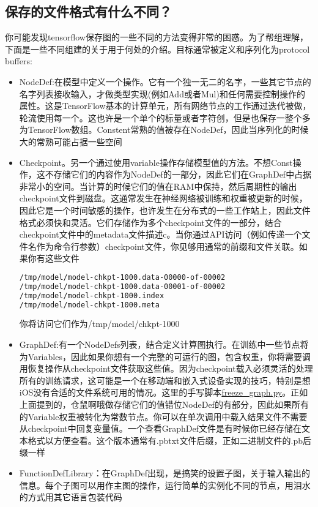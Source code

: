 \subsection{保存的文件格式有什么不同？}
你可能发现tensorflow保存图的一些不同的方法变得非常的困惑。为了帮组理解，下面是一些不同组建的关于用于何处的介绍。目标通常被定义和序列化为protocol buffers:
\begin{itemize}
\item NodeDef:在模型中定义一个操作。它有一个独一无二的名字，一些其它节点的名字列表接收输入，才做类型实现(例如Add或者Mul)和任何需要控制操作的属性。这是TensorFlow基本的计算单元，所有网络节点的工作通过迭代被做，轮流使用每一个。这也许是一个单个的标量或者字符创，但是也保存一整个多为TensorFlow数组。Constent常熟的值被存在NodeDef，因此当序列化的时候大的常熟可能占据一些空间
\item Checkpoint。另一个通过使用variable操作存储模型值的方法。不想Const操作，这不存储它们的内容作为NodeDef的一部分，因此它们在GraphDef中占据非常小的空间。当计算的时候它们的值在RAM中保持，然后周期性的输出checkpoint文件到磁盘。这通常发生在神经网络被训练和权重被更新的时候，因此它是一个时间敏感的操作，也许发生在分布式的一些工作站上，因此文件格式必须快和灵活。它们存储作为多个checkpoint文件的一部分，结合checkpoint文件中的metadata文件描述c。当你通过API访问（例如传递一个文件名作为命令行参数）checkpoint文件，你见够用通常的前缀和文件关联。如果你有这些文件
\begin{lstlisting}[language=Bash]
/tmp/model/model-chkpt-1000.data-00000-of-00002
/tmp/model/model-chkpt-1000.data-00001-of-00002
/tmp/model/model-chkpt-1000.index
/tmp/model/model-chkpt-1000.meta
\end{lstlisting}
你将访问它们作为/tmp/model/chkpt-1000
\item GraphDef:有一个NodeDefs列表，结合定义计算图执行。在训练中一些节点将为Variables，因此如果你想有一个完整的可运行的图，包含权重，你将需要调用恢复操作从checkpoint文件获取这些值。因为checkpoint载入必须灵活的处理所有的训练请求，这可能是一个在移动端和嵌入式设备实现的技巧，特别是想iOS没有合适的文件系统可用的情况。这里的手写脚本\href{https://www.github.com/tensorflow/tensorflow/blob/r1.4/tensorflow/python/tools/freeze_graph.py}{freeze\_graph.py}。正如上面提到的，仓鼠啊哦做存储它们的值错位NodeDef的有部分，因此如果所有的Variable权重被转化为常数节点。你可以在单次调用中载入结果文件不需要从checkpoint中回复变量值。一个查看GraphDef文件是有时候你已经存储在文本格式以方便查看。这个版本通常有.pbtxt文件后缀，正如二进制文件的.pb后缀一样
\item FunctionDefLibrary：在GraphDef出现，是搞笑的设置子图，关于输入输出的信息。每个子图可以用作主图的操作，运行简单的实例化不同的节点，用泪水的方式用其它语言包装代码

\end{itemize}

